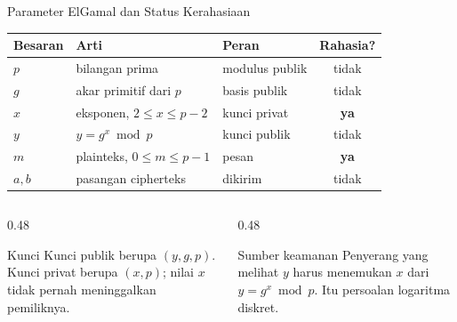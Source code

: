 \documentclass[aspectratio=169,11pt]{beamer}
\begin{document}
\begin{frame}{Parameter ElGamal dan Status Kerahasiaan}
    \footnotesize
    \begin{tabularx}{\linewidth}{@{}l l X c@{}}
        \toprule
        \textbf{Besaran} & \textbf{Arti} & \textbf{Peran} & \textbf{Rahasia?} \\
        \midrule
        $p$ & bilangan prima & modulus publik & tidak \\
        \addlinespace
        $g$ & akar primitif dari $p$ & basis publik & tidak \\
        \addlinespace
        $x$ & eksponen, $2 \le x \le p-2$ & kunci privat & \textbf{ya} \\
        \addlinespace
        $y$ & $y = g^{x} \bmod p$ & kunci publik & tidak \\
        \addlinespace
        $m$ & plainteks, $0 \le m \le p-1$ & pesan & \textbf{ya} \\
        \addlinespace
        $a,b$ & pasangan cipherteks & dikirim & tidak \\
        \bottomrule
    \end{tabularx}
    \vspace{0.2cm}
    \begin{columns}[T,onlytextwidth]
        \begin{column}{0.48\textwidth}
            \begin{block}{Kunci}
                \footnotesize
                Kunci publik berupa $(y,g,p)$. Kunci privat berupa
                $(x,p)$; nilai $x$ tidak pernah meninggalkan pemiliknya.
            \end{block}
        \end{column}
        \begin{column}{0.48\textwidth}
            \begin{alertblock}{Sumber keamanan}
                \footnotesize
                Penyerang yang melihat $y$ harus menemukan $x$ dari
                $y = g^{x} \bmod p$. Itu persoalan logaritma diskret.
            \end{alertblock}
        \end{column}
    \end{columns}
\end{frame}
\end{document}
